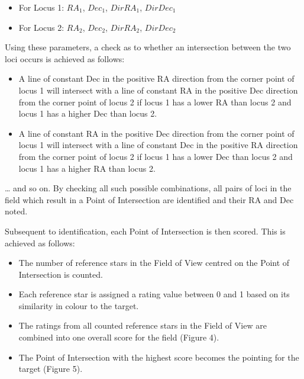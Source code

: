 \documentclass[]{elsarticle} %
\providecommand{\tightlist}{%
  \setlength{\itemsep}{0pt}\setlength{\parskip}{0pt}}
\begin{document}
\begin{itemize}
\tightlist
\item
  For Locus 1: \(RA_1\), \(Dec_1\), \(DirRA_1\), \(DirDec_1\)
\item
  For Locus 2: \(RA_2\), \(Dec_2\), \(DirRA_2\), \(DirDec_2\)
\end{itemize}

Using these parameters, a check as to whether an intersection between
the two loci occurs is achieved as follows:

\begin{itemize}
\tightlist
\item
  A line of constant Dec in the positive RA direction from the corner
  point of locus 1 will intersect with a line of constant RA in the
  positive Dec direction from the corner point of locus 2 if locus 1 has
  a lower RA than locus 2 and locus 1 has a higher Dec than locus 2.
\item
  A line of constant RA in the positive Dec direction from the corner
  point of locus 1 will intersect with a line of constant Dec in the
  positive RA direction from the corner point of locus 2 if locus 1 has
  a lower Dec than locus 2 and locus 1 has a higher RA than locus 2.
\end{itemize}

\ldots{} and so on. By checking all such possible combinations, all
pairs of loci in the field which result in a Point of Intersection are
identified and their RA and Dec noted.

Subsequent to identification, each Point of Intersection is then scored.
This is achieved as follows:

\begin{itemize}
\tightlist
\item
  The number of reference stars in the Field of View centred on the
  Point of Intersection is counted.
\item
  Each reference star is assigned a rating value between 0 and 1 based
  on its similarity in colour to the target.
\item
  The ratings from all counted reference stars in the Field of View are
  combined into one overall score for the field (Figure 4).
\item
  The Point of Intersection with the highest score becomes the pointing
  for the target (Figure 5).
\end{itemize}
\end{document}
